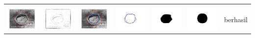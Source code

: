 \begin{table}[H]
\begin{tabular}{|m{0.7in}|m{0.7in}|m{0.7in}|m{0.7in}|m{0.7in}|m{0.7in}|m{0.7in}|}
		
		&  &  & & & &  \\
		\includegraphics[width=0.7in]{dataset/dataset_3/luka_kuning/ready/34_integer_init.jpg}&
		\includegraphics[width=0.7in]{dataset/dataset_3/luka_kuning/ready/34_integer_ext.jpg}&
		\includegraphics[width=0.7in]{dataset/dataset_3/luka_kuning/ready/34_integer_result.jpg}&
		\includegraphics[width=0.7in]{dataset/dataset_3/luka_kuning/ready/34_gt_r_integer.jpg}&
		\includegraphics[width=0.7in]{dataset/dataset_3/luka_kuning/ready/34_r.jpg}&
		\includegraphics[width=0.7in]{dataset/dataset_3/luka_kuning/ready/34_integer_r.jpg}&
		berhasil \\
		\hline
		

\end{tabular}
\end{table}
